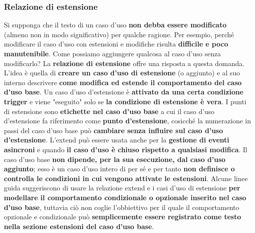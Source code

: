 \documentclass[12pt]{article}
\begin{document}
\subsubsection{Relazione di estensione}
Si supponga che il testo di un caso d'uso \textbf{non debba essere modificato} (almeno non in modo significativo) per qualche ragione.
Per esempio, perché modificare il caso d'uso con estensioni e modifiche risulta \textbf{difficile e poco manutenibile}.
Come possiamo aggiungere qualcosa al caso d'uso senza modificarlo?
La \textbf{relazione di estensione} offre una risposta a questa domanda. L'idea è quella di \textbf{creare un caso d'uso di estensione} (o aggiunto) e al suo interno descrivere \textbf{come modifica ed estende il comportamento del caso d'uso base}.
Un caso d'uso d'estensione è \textbf{attivato da una certa condizione trigger} e viene "eseguito" solo se \textbf{la condizione di estensione è vera}.
I punti di estensione sono \textbf{etichette nel caso d'uso base} a cui il caso d'uso d'estensione fa riferimento come \textbf{punto d'estensione}, cosicché la numerazione in passi del caso d'uso base può \textbf{cambiare senza influire sul caso d'uso d'estensione}.
L'extend può essere usata anche per la \textbf{gestione di eventi asincroni} e quando \textbf{il caso d'uso è chiuso rispetto a qualsiasi modifica}.
Il caso d'uso base \textbf{non dipende, per la sua esecuzione, dal caso d'uso aggiunto}; esso è un caso d'uso intero di per sé e per tanto \textbf{non definisce o controlla le condizioni in cui vengono attivate le estensioni}.
Alcune linee guida suggeriscono di usare la relazione extend e i casi d'uso di estensione \textbf{per modellare il comportamento condizionale o opzionale inserito nel caso d'uso base}, tuttavia ciò non coglie l'obbiettivo per il quale il comportamento opzionale e condizionale può \textbf{semplicemente essere registrato come testo nella sezione estensioni del caso d'uso base}.
\end{document}

